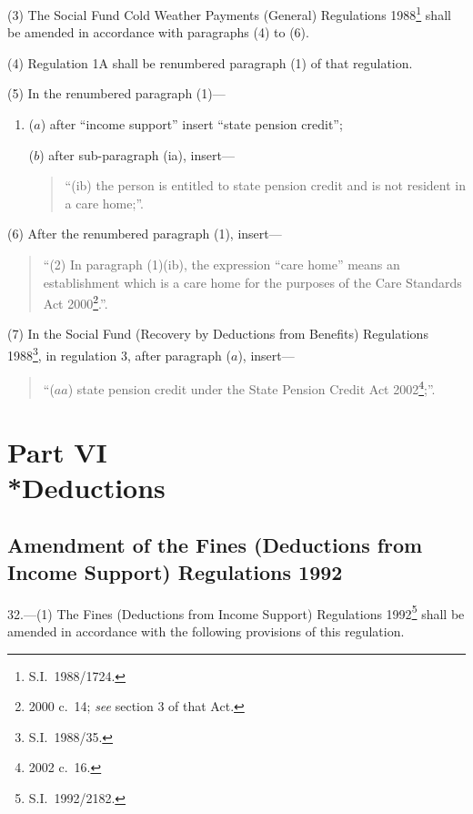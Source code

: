 \documentclass[12pt,a4paper]{article}
\begin{document}
(3) The Social Fund Cold Weather Payments (General) Regulations 1988\footnote{S.I.\ 1988/1724.} shall be amended in accordance with paragraphs (4) to (6).

(4) Regulation 1A shall be renumbered paragraph (1) of that regulation.

(5) In the renumbered paragraph (1)—
\begin{enumerate}\item[]
($a$) after “income support” insert “state pension credit”;

($b$) after sub-paragraph (ia), insert—
\begin{quotation}
“(ib) the person is entitled to state pension credit and is not resident in a care home;”.
\end{quotation}
\end{enumerate}

(6) After the renumbered paragraph (1), insert—
\begin{quotation}
“(2) In paragraph (1)(ib), the expression “care home” means an establishment which is a care home for the purposes of the Care Standards Act 2000\footnote{2000 c.\ 14; \emph{see} section 3 of that Act.}.”.
\end{quotation}

(7) In the Social Fund (Recovery by Deductions from Benefits) Regulations 1988\footnote{S.I.\ 1988/35.}, in regulation 3, after paragraph ($a$), insert—
\begin{quotation}
“($aa$) state pension credit under the State Pension Credit Act 2002\footnote{2002 c.\ 16.};”.
\end{quotation}

\section[Part VI --- Deductions]{Part VI\\*Deductions}

\subsection[32. Amendment of the Fines (Deductions from Income Support) Regulations 1992]{Amendment of the Fines (Deductions from Income Support) Regulations 1992}

\renewcommand\parthead{--- Part VI}

32.---(1)  The Fines (Deductions from Income Support) Regulations 1992\footnote{S.I.\ 1992/2182.} shall be amended in accordance with the following provisions of this regulation.
\end{document}
